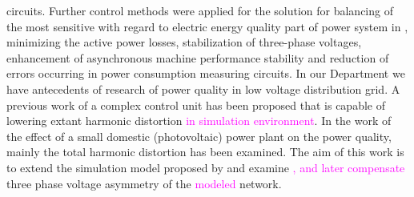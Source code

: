 circuits. Further control methods were applied for the solution for balancing of the most sensitive with regard to electric energy quality part of power system in \cite{uimethod},  minimizing the active power losses, stabilization of three-phase voltages, enhancement of asynchronous machine performance stability and reduction of errors occurring in power consumption measuring circuits. In our Department we have antecedents of research of power quality in low voltage distribution grid. A previous work of \cite{gorbe2012reduction} a complex control unit has been proposed that is capable of lowering extant harmonic distortion \textcolor{magenta}{in simulation environment}. In the work of \cite{Gorbe2014experimental} the effect of a small domestic (photovoltaic) power plant on the power quality, mainly the total harmonic distortion has been examined. The aim of this work is to extend the simulation model proposed by \cite{gorbe2012reduction} and examine \textcolor{magenta}{, and later compensate} three phase voltage asymmetry of the \textcolor{magenta}{modeled} network.
%
